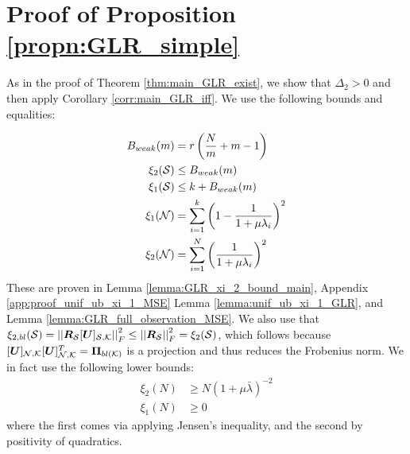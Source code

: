 \section{Proof of Proposition \ref{propn:GLR_simple}}
\label{app:proof_propn_GLR_simple}
As in the proof of Theorem \ref{thm:main_GLR_exist}, we show that $\Delta_{2} > 0$ and then apply Corollary \ref{corr:main_GLR_iff}. We use the following bounds and equalities:

\begin{align}
B_{weak}(m) &= r\left(\frac{N}{m} + m-1 \right) \\
    \xi_{2}(\mathcal{S}) &\leq B_{weak}(m)\\
    \xi_{1}(\mathcal{S}) &\leq k +  B_{weak}(m)\\
    \xi_{1}(\mathcal{N}) &= \sum_{i=1}^{k} \left(1 - \frac{1}{1+\mu\lambda_{i}}\right)^{2} \\
    \xi_{2}(\mathcal{N}) & = \sum_{i=1}^{N} \left( \frac{1}{1+\mu\lambda_{i}}\right)^{2}
\end{align}
These are proven in Lemma \ref{lemma:GLR_xi_2_bound_main}, Appendix \ref{app:proof_unif_ub_xi_1_MSE} Lemma \ref{lemma:unif_ub_xi_1_GLR}, and Lemma \ref{lemma:GLR_full_observation_MSE}. We also use that $\xi_{2,bl}(\set{S}) = \sqfrob{\matr{R}_{\set{S}}\matrsubU{S}} \leq \sqfrob{\matr{R}_{\set{S}}} = \xi_{2}(\set{S})$, which follows because $\matrsubU{N}\matrsubU{N}^{T} = \projbl$ is a projection and thus reduces the Frobenius norm.
We in fact use the following lower bounds:
\begin{align}
    \xi_{2}(N) &\geq N (1 + \mu\bar{\lambda})^{-2} \\
    \xi_{1}(N) &\geq 0
\end{align}
where the first comes via applying Jensen's inequality, and the second by positivity of quadratics.


